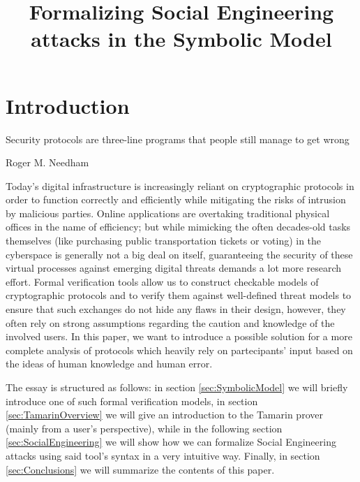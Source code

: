 \documentclass{article}
\title{Formalizing Social Engineering attacks in the Symbolic Model}
\begin{document}
\maketitle
\tableofcontents


\section*{Introduction} %


\epigraph{Security protocols are three-line programs that people still manage to get wrong}{Roger M. Needham}

Today's digital infrastructure is increasingly reliant on cryptographic protocols in order to function correctly and efficiently while mitigating the risks of intrusion by malicious parties. Online applications are overtaking traditional physical offices in the name of efficiency; but while mimicking the often decades-old tasks themselves (like purchasing public transportation tickets or voting) in the cyberspace is generally not a big deal on itself, guaranteeing the security of these virtual processes against emerging digital threats demands a lot more research effort. Formal verification tools allow us to construct checkable models of cryptographic protocols and to verify them against well-defined threat models to ensure that such exchanges do not hide any flaws in their design, however, they often rely on strong assumptions regarding the caution and knowledge of the involved users. In this paper, we want to introduce a possible solution for a more complete analysis of protocols which heavily rely on partecipants' input based on the ideas of human knowledge and human error.

The essay is structured as follows: in section \ref{sec:SymbolicModel} we will briefly introduce one of such formal verification models, in section \ref{sec:TamarinOverview} we will give an introduction to the Tamarin prover (mainly from a user's perspective), while in the following section \ref{sec:SocialEngineering} we will show how we can formalize Social Engineering attacks using said tool's syntax in a very intuitive way. Finally, in section \ref{sec:Conclusions} we will summarize the contents of this paper.
\end{document}

